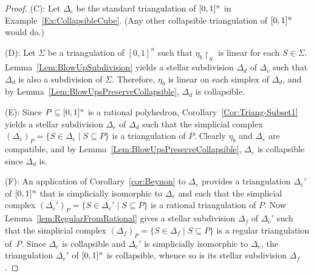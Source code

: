 \documentclass[reqno, draft]{amsart}
\theoremstyle{definition}
\begin{document}
\begin{proof}
 (C):
Let $\Delta_c$  be the  
standard triangulation of  ${[0,1]^{\it n}}$  
in Example~\ref{Ex:CollapsibleCube}.
(Any other collapsible triangulation of ${[0,1]^{\it n}}$ would do.)
\medskip

 (D): 
Let $\Sigma$ be a triangulation of $[0,1]^n$ such that 
$\eta_b{\upharpoonright}_{S}$ is linear for each $S\in\Sigma$.
Lemma~\ref{Lem:BlowUpSubdivision} yields a stellar subdivision  $\Delta_d$ of $\Delta_c$ 
such that $\Delta_d$ is also a subdivision of $\Sigma$. 
Therefore, $\eta_b$ is linear on each simplex of $\Delta_d$, 
and by Lemma~\ref{Lem:BlowUpsPreserveCollapsible}, 
$\Delta_d$ is collapsible.
\medskip

 (E):
Since $P\subseteq{[0,1]^{\it n}}$ is a rational polyhedron, 
Corollary~\ref{Cor:Triang-Subset1} yields a stellar subdivision 
$\Delta_e$ of  $\Delta_d$ such that the simplicial complex 
$(\Delta_e)_P=\{S\in\Delta_e\mid S\subseteq P\}$ 
is a triangulation of $P$. 
Clearly  $\eta_b$ and $\Delta_e$ are compatible, 
and by Lemma~\ref{Lem:BlowUpsPreserveCollapsible},
 $\Delta_e$ is collapsible since $\Delta_d$ is.
\medskip

 (F):
An application of Corollary~\ref{cor:Beynon} to  $\Delta_e$ 
provides a triangulation $\Delta_e'$  of ${[0,1]^{\it n}}$ 
that is simplicially isomorphic to $\Delta_e$ 
and such that the simplicial complex 
$(\Delta_e')_P=\{S\in\Delta_e'\mid S\subseteq P\}$ 
is a rational triangulation of $P$. 
Now Lemma~\ref{lem:RegularFromRational} 
gives  a stellar subdivision $\Delta_f$  of $\Delta_e'$ 
such that the simplicial complex 
$(\Delta_f)_P=\{S\in\Delta_f\mid S\subseteq P\}$ 
is a regular triangulation of~$P$. 
Since $\Delta_e$ is collapsible 
and  $\Delta_e'$ is simplicially isomorphic to $\Delta_e$, 
the triangulation  $\Delta_e'$ of ${[0,1]^{\it n}}$ is collapsible, 
whence so is its stellar subdivision $\Delta_f$.
\medskip


\end{proof}
\end{document}
